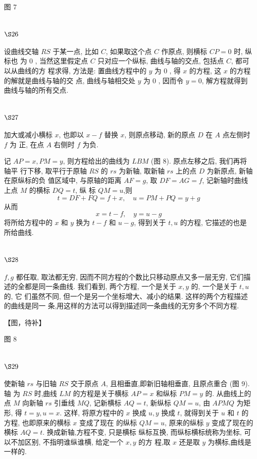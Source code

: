 图 7

\section{$\S 26$}

设曲线交轴 $R S$ 于某一点, 比如 $C$, 如果取这个点 $C$ 作原点, 则横标 $C P=0$ 时, 纵标也 为 0 , 当然这里假定点 $C$ 只对应一个纵标, 曲线与轴的交点, 包括点 $C$, 都可以从曲线的方 程求得, 方法是: 置曲线方程中的 $y$ 为 0 , 得 $x$ 的方程, 这 $x$ 的方程的解就是曲线与轴的交 点, 曲线与轴相交处 $y$ 为 0 , 因而令 $y=0$, 解方程就得到曲线与轴的所有交点.

\section{$\S 27$}

加大或减小横标 $x$, 也即以 $x-f$ 替换 $x$, 则原点移动, 新的原点 $D$ 在 $A$ 点左侧时 $f$ 为 正, 在点 $A$ 右侧时 $f$ 为负.

记 $A P=x, P M=y$, 则方程给出的曲线为 $L B M$ (图 8). 原点左移之后, 我们再将轴平 行下移, 取平行于原轴 $R S$ 的 $r s$ 为新轴, 取新轴 $r s$ 上的点 $D$ 为新原点, 新轴在原纵标的负 值区域中, 与原轴的距离 $A F=g$, 取 $D F=A G=f$, 记新轴时曲线上点 $M$ 的横标 $D Q=t$, 纵 标 $Q M=u$,则
\[
t=D F+F Q=f+x, \quad u=P M+P Q=y+g
\]
从而
\[
x=t-f, \quad y=u-g
\]
将所给方程中的 $x$ 和 $y$ 换为 $t-f$ 和 $u-g$, 得到关于 $t, u$ 的方程, 它描述的也是所给曲线.

\section{$\S 28$}

$f, g$ 都任取, 取法都无穷, 因而不同方程的个数比只移动原点又多一层无穷, 它们描 述的全都是同一条曲线. 我们看到, 两个方程, 一个是关于 $x, y$ 的, 一个是关于 $t, u$ 的, 它 们虽然不同, 但一个是另一个坐标增大、减小的结果. 这样的两个方程描述的曲线是同一 条,用这样的方法可以得到描述同一条曲线的无穷多个不同方程. 

【图，待补】

图 8

\section{$\S 29$}

使新轴 $r s$ 与旧轴 $R S$ 交于原点 $A$, 且相垂直,即新旧轴相垂直, 且原点重合 (图 9). 轴 为 $R S$ 时,曲线 $L M$ 的方程是关于横标 $A P=x$ 和纵标 $P M=y$ 的. 从曲线上的点 $M$ 向新轴 $r s$ 引垂线 $M Q$, 记新横标 $A Q=t$, 新纵标 $Q M=u$, 由 $A P M Q$ 为矩形, 得 $t=y, u=x$. 这样, 将原方程中的 $x$ 换成 $u, y$ 换成 $t$, 就得到关于 $u$ 和 $t$ 的方程, 也即原来的横标 $x$ 变成了现在 的纵标 $Q M=u$, 原来的纵标 $y$ 变成了现在的横标 $A Q=t$. 换成新轴,方程不变, 只是横标 纵标互换, 而纵标横标统称为坐标, 可以不加区别, 不指明谁纵谁横, 给定一个 $x, y$ 的方 程,取 $x$ 还是取 $y$ 为横标,曲线是一样的.


